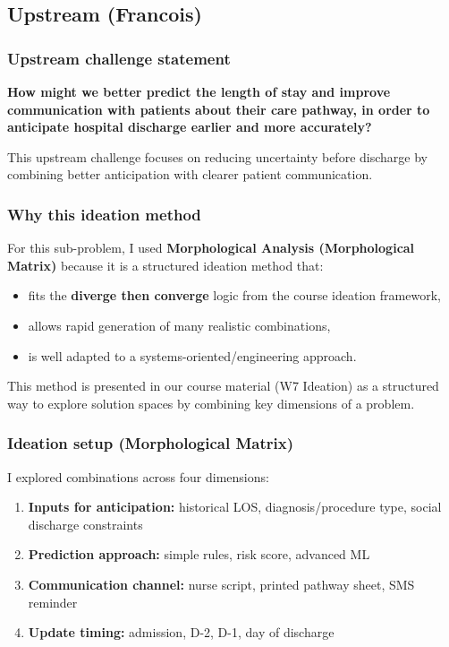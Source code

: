 {\color{blue}
\subsection{Upstream (Francois)}

\subsubsection{Upstream challenge statement}
\textbf{How might we better predict the length of stay and improve communication with patients about their care pathway, in order to anticipate hospital discharge earlier and more accurately?}

This upstream challenge focuses on reducing uncertainty before discharge by combining better anticipation with clearer patient communication.

\subsubsection{Why this ideation method}
For this sub-problem, I used \textbf{Morphological Analysis (Morphological Matrix)} because it is a structured ideation method that:
\begin{itemize}
  \item fits the \textbf{diverge then converge} logic from the course ideation framework,
  \item allows rapid generation of many realistic combinations,
  \item is well adapted to a systems-oriented/engineering approach.
\end{itemize}

This method is presented in our course material (W7 Ideation) as a structured way to explore solution spaces by combining key dimensions of a problem.

\subsubsection{Ideation setup (Morphological Matrix)}
I explored combinations across four dimensions:
\begin{enumerate}
  \item \textbf{Inputs for anticipation:} historical LOS, diagnosis/procedure type, social discharge constraints
  \item \textbf{Prediction approach:} simple rules, risk score, advanced ML
  \item \textbf{Communication channel:} nurse script, printed pathway sheet, SMS reminder
  \item \textbf{Update timing:} admission, D-2, D-1, day of discharge
\end{enumerate}

}
